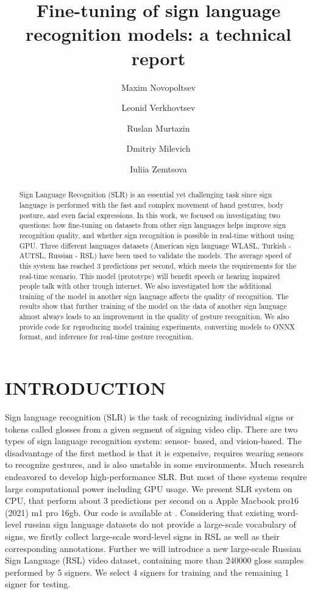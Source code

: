 \documentclass[]{spie}
\title{Fine-tuning of sign language recognition models: a technical report}
\author[a]{Maxim Novopoltsev}
\author[b]{Leonid Verkhovtsev}
\author[c]{Ruslan Murtazin}
\author[d]{Dmitriy Milevich}
\author[e]{Iuliia Zemtsova}
\affil[a,b,c,d,e]{SBER AI, Moscow, Russia}
\begin{document}
 
\maketitle
\begin{abstract}
Sign Language Recognition (SLR) is an essential yet challenging task since sign language is performed with the fast and complex movement of hand gestures, body posture, and even facial expressions. In this work, we focused on investigating two questions: how fine-tuning on datasets from other sign languages helps improve sign recognition quality, and whether sign recognition is possible in real-time without using GPU. Three different languages datasets (American sign language WLASL, Turkish - AUTSL, Russian - RSL) have been used to validate the models. The average speed of this system has reached 3 predictions per second, which meets the requirements for the real-time scenario. This model (prototype) will benefit speech or hearing impaired people talk with other trough internet. We also investigated how the additional training of the model in another sign language affects the quality of recognition. The results show that further training of the model on the data of another sign language almost always leads to an improvement in the quality of gesture recognition. We also provide code for reproducing model training experiments, converting models to ONNX format, and inference for real-time gesture recognition.
\end{abstract}

\section{INTRODUCTION}
\label{sec:intro}  Sign language recognition (SLR) is the task of recognizing individual signs or tokens called glosses from a given segment of signing video clip. There are two types of sign language recognition system: sensor- based, and vision-based. The disadvantage of the first method is that it is expensive, requires wearing sensors to recognize gestures, and is also unstable in some environments. Much research endeavored to develop high-performance SLR. But most of these systems require large computational power including GPU usage. We present SLR system on CPU, that perform about 3 predictions per second on a Apple Macbook pro16 (2021) m1 pro 16gb. Our code is available at \cite{slr_rsl_github}. Considering that existing word-level russian sign language datasets do not provide a large-scale vocabulary of signs, we firstly collect large-scale word-level signs in RSL as well as their corresponding annotations. Further we will introduce a new large-scale Russian Sign Language (RSL) video dataset, containing more than 240000 gloss samples performed by 5 signers. We select 4 signers for training and the remaining 1 signer for testing. 
 
\end{document}
